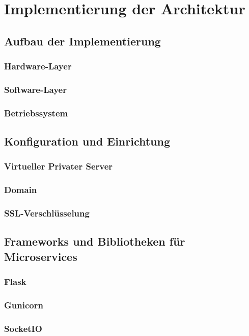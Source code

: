 \chapter{Implementierung der Architektur}

\section{Aufbau der Implementierung}
\subsection{Hardware-Layer}
\subsection{Software-Layer}
\subsection{Betriebssystem}

\section{Konfiguration und Einrichtung}
\subsection{Virtueller Privater Server}
\subsection{Domain}
\subsection{SSL-Verschlüsselung}

\section{Frameworks und Bibliotheken für Microservices}
\subsection{Flask}
\subsection{Gunicorn}
\subsection{SocketIO}
